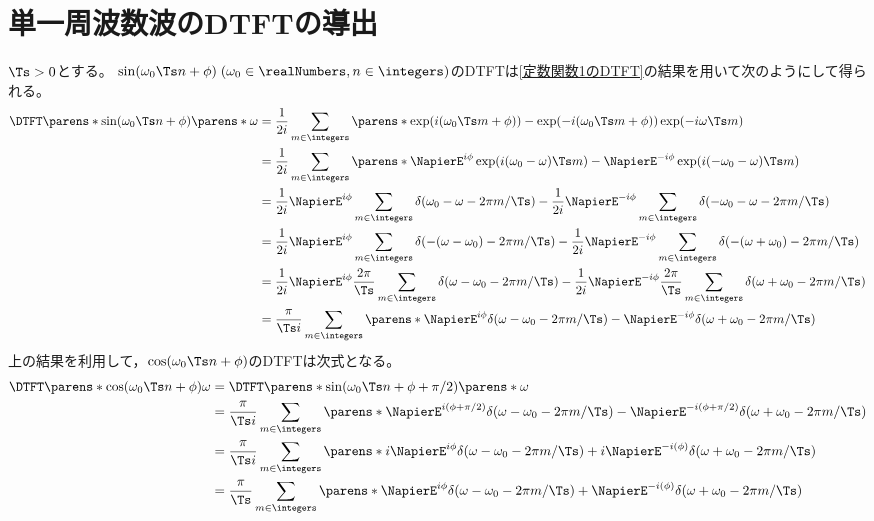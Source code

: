     \section{単一周波数波のDTFTの導出}
        $\Ts>0$とする。
        $\sin(\omega_0 \Ts n + \phi)\;(\omega_0\in\realNumbers, n\in\integers)$のDTFTは\ref{定数関数1のDTFT}の結果を用いて次のようにして得られる。
        \begin{align*}
            \DTFT\parens*{\sin(\omega_0 \Ts n + \phi)}\parens*{\omega} &= \frac{1}{2i}\sum_{m\in\integers} \parens*{\exp(i(\omega_0\Ts m + \phi)) - \exp(-i(\omega_0\Ts m + \phi))}\exp(-i\omega\Ts m) \\
            &= \frac{1}{2i}\sum_{m\in\integers} \parens*{\NapierE^{i\phi}\exp(i(\omega_0-\omega)\Ts m) - \NapierE^{-i\phi}\exp(i(-\omega_0-\omega)\Ts m)} \\
            &= \frac{1}{2i}\NapierE^{i\phi}\sum_{m\in\integers}\delta(\omega_0-\omega - 2\pi m/\Ts) - \frac{1}{2i}\NapierE^{-i\phi}\sum_{m\in\integers}\delta(-\omega_0-\omega - 2\pi m/\Ts) \\
            &= \frac{1}{2i}\NapierE^{i\phi}\sum_{m\in\integers}\delta(-(\omega-\omega_0) - 2\pi m/\Ts) - \frac{1}{2i}\NapierE^{-i\phi}\sum_{m\in\integers}\delta(-(\omega+\omega_0) - 2\pi m/\Ts) \\
            &= \frac{1}{2i}\NapierE^{i\phi}\frac{2\pi}{\Ts}\sum_{m\in\integers}\delta(\omega-\omega_0 - 2\pi m/\Ts) - \frac{1}{2i}\NapierE^{-i\phi}\frac{2\pi}{\Ts}\sum_{m\in\integers}\delta(\omega+\omega_0 - 2\pi m/\Ts) \\
            &= \frac{\pi}{\Ts i}\sum_{m\in\integers}\parens*{\NapierE^{i\phi}\delta(\omega-\omega_0 - 2\pi m/\Ts) - \NapierE^{-i\phi}\delta(\omega+\omega_0 - 2\pi m/\Ts)}
        \end{align*}
        上の結果を利用して，$\cos(\omega_0 \Ts n + \phi)$のDTFTは次式となる。
        \begin{align*}
            \DTFT\parens*{\cos(\omega_0 \Ts n + \phi)}{\omega} &= \DTFT\parens*{\sin(\omega_0 \Ts n + \phi + \pi/2)}\parens*{\omega} \\
            &= \frac{\pi}{\Ts i}\sum_{m\in\integers}\parens*{\NapierE^{i(\phi+\pi/2)}\delta(\omega-\omega_0 - 2\pi m/\Ts) - \NapierE^{-i(\phi+\pi/2)}\delta(\omega+\omega_0 - 2\pi m/\Ts)} \\
            &= \frac{\pi}{\Ts i}\sum_{m\in\integers}\parens*{i\NapierE^{i\phi}\delta(\omega-\omega_0 - 2\pi m/\Ts) + i\NapierE^{-i(\phi)}\delta(\omega+\omega_0 - 2\pi m/\Ts)} \\
            &= \frac{\pi}{\Ts}\sum_{m\in\integers}\parens*{\NapierE^{i\phi}\delta(\omega-\omega_0 - 2\pi m/\Ts) + \NapierE^{-i(\phi)}\delta(\omega+\omega_0 - 2\pi m/\Ts)}
        \end{align*}

